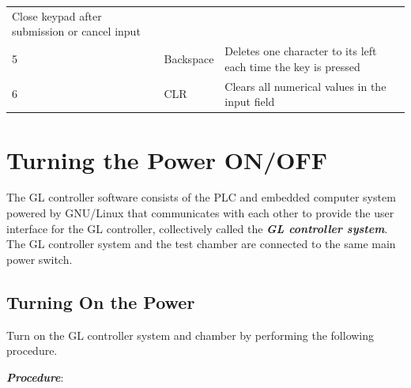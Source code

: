 \begin{longtable}[]{@{}|l|l|l|@{}}
\begin{minipage}[t]{0.65\columnwidth}
Close keypad after submission or cancel input\strut
\end{minipage}\tabularnewline
\begin{minipage}[t]{0.04\columnwidth}\raggedright
5\strut
\end{minipage} & \begin{minipage}[t]{0.23\columnwidth}\raggedright
Backspace\strut
\end{minipage} & \begin{minipage}[t]{0.65\columnwidth}\raggedright
Deletes one character to its left each time the key is pressed\strut
\end{minipage}\tabularnewline
\begin{minipage}[t]{0.04\columnwidth}\raggedright
6\strut
\end{minipage} & \begin{minipage}[t]{0.23\columnwidth}\raggedright
CLR\strut
\end{minipage} & \begin{minipage}[t]{0.65\columnwidth}\raggedright
Clears all numerical values in the input field\strut
\end{minipage}\tabularnewline
\bottomrule
\end{longtable}


\section{Turning the Power
ON/OFF}

The GL controller software consists of the PLC and embedded computer
system powered by GNU/Linux that communicates with each other to provide
the user interface for the GL controller, collectively called the
\emph{\textbf{GL controller system}}. The GL controller system and the
test chamber are connected to the same main power switch.


\subsection{Turning On the Power}

Turn on the GL controller system and chamber by performing the following
procedure.

\textbf{\emph{Procedure}}:

